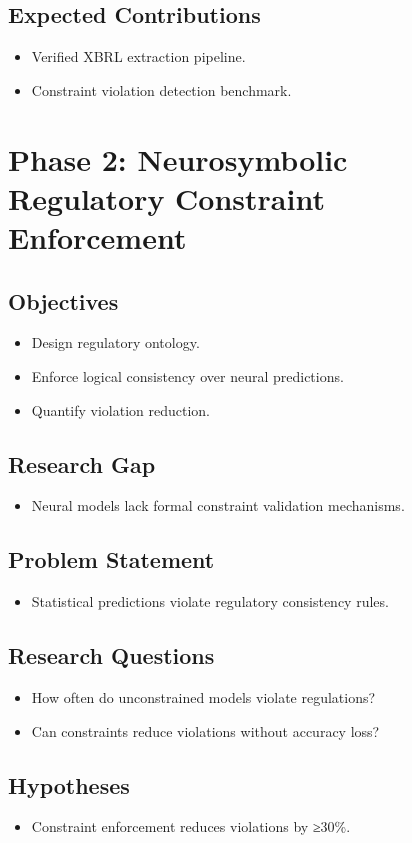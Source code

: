\documentclass{article}
\begin{document}
\subsection{Expected Contributions}
\begin{itemize}
  \item Verified XBRL extraction pipeline.
  \item Constraint violation detection benchmark.
\end{itemize}
\section{Phase 2: Neurosymbolic Regulatory Constraint Enforcement}
\subsection{Objectives}
\begin{itemize}
  \item Design regulatory ontology.
  \item Enforce logical consistency over neural predictions.
  \item Quantify violation reduction.
\end{itemize}
\subsection{Research Gap}
\begin{itemize}
  \item Neural models lack formal constraint validation mechanisms.
\end{itemize}
\subsection{Problem Statement}
\begin{itemize}
  \item Statistical predictions violate regulatory consistency rules.
\end{itemize}
\subsection{Research Questions}
\begin{itemize}
  \item How often do unconstrained models violate regulations?
  \item Can constraints reduce violations without accuracy loss?
\end{itemize}
\subsection{Hypotheses}
\begin{itemize}
  \item Constraint enforcement reduces violations by ≥30\%.
\end{itemize}
\end{document}
